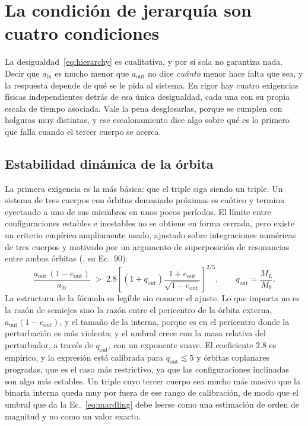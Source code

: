 \documentclass[11pt,a4paper,openany]{book}
\newcommand{\ain}{a_{\mathrm{in}}}
\newcommand{\aout}{a_{\mathrm{out}}}
\begin{document}
\section{La condici\'on de jerarqu\'ia son cuatro condiciones}
\label{sec:jerarquia}

La desigualdad~\eqref{eq:hierarchy} es cualitativa, y por s\'i sola no
garantiza nada. Decir que $\ain$ es mucho menor que $\aout$ no dice
\emph{cu\'anto} menor hace falta que sea, y la respuesta depende de qu\'e se
le pida al sistema. En rigor hay cuatro exigencias f\'isicas independientes
detr\'as de esa \'unica desigualdad, cada una con su propia escala de tiempo
asociada. Vale la pena desglosarlas, porque se cumplen con holguras muy
distintas, y ese escalonamiento dice algo sobre qu\'e es lo primero que falla
cuando el tercer cuerpo se acerca.

\subsection*{Estabilidad din\'amica de la \'orbita}
\label{sub:estabilidad}

La primera exigencia es la m\'as b\'asica: que el triple siga siendo un
triple. Un sistema de tres cuerpos con \'orbitas demasiado pr\'oximas es
ca\'otico y termina eyectando a uno de sus miembros en unos pocos per\'iodos.
El l\'imite entre configuraciones estables e inestables no se obtiene en forma
cerrada, pero existe un criterio emp\'irico ampliamente usado, ajustado sobre
integraciones num\'ericas de tres cuerpos y motivado por un argumento de
superposici\'on de resonancias entre ambas \'orbitas
(\citealp{MardlingAarseth2001}, su Ec.~90):
\begin{equation}
  \frac{\aout\,(1-e_\mathrm{out})}{\ain}
  \;>\;
  2.8\left[\left(1+q_\mathrm{out}\right)
  \frac{1+e_\mathrm{out}}{\sqrt{1-e_\mathrm{out}}}\right]^{2/5},
  \qquad q_\mathrm{out}=\frac{M_L}{M_b}.
  \label{eq:mardling}
\end{equation}
La estructura de la f\'ormula es leg\'ible sin conocer el ajuste. Lo que
importa no es la raz\'on de semiejes sino la raz\'on entre el pericentro de la
\'orbita externa, $\aout(1-e_\mathrm{out})$, y el tama\~no de la interna,
porque es en el pericentro donde la perturbaci\'on es m\'as violenta; y el
umbral crece con la masa relativa del perturbador, a trav\'es de
$q_\mathrm{out}$, con un exponente suave. El coeficiente $2.8$ es emp\'irico,
y la expresi\'on est\'a calibrada para $q_\mathrm{out}\lesssim5$ y \'orbitas
coplanares progradas, que es el caso m\'as restrictivo, ya que las
configuraciones inclinadas son algo m\'as estables. Un triple cuyo tercer
cuerpo sea mucho m\'as masivo que la binaria interna queda muy por fuera de
ese rango de calibraci\'on, de modo que el umbral que da la
Ec.~\eqref{eq:mardling} debe leerse como una estimaci\'on de orden de
magnitud y no como un valor exacto.
\end{document}
